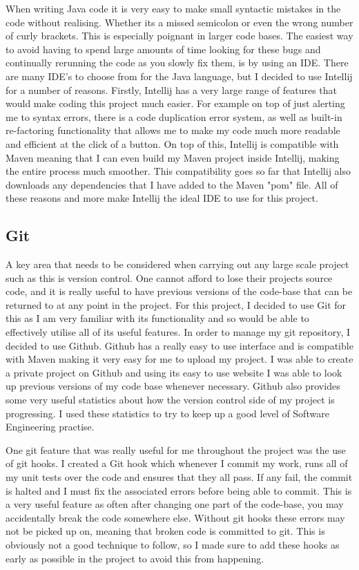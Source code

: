 When writing Java code it is very easy to make small syntactic mistakes in the code without realising. Whether its a missed semicolon or even the wrong number of curly brackets. This is especially poignant in larger code bases. The easiest way to avoid having to spend large amounts of time looking for these bugs and continually rerunning the code as you slowly fix them, is by using an IDE. There are many IDE's to choose from for the Java language, but I decided to use Intellij for a number of reasons. Firstly, Intellij has a very large range of features that would make coding this project much easier. For example on top of just alerting me to syntax errors, there is a code duplication error system, as well as built-in re-factoring functionality that allows me to make my code much more readable and efficient at the click of a button. On top of this, Intellij is compatible with Maven meaning that I can even build my Maven project inside Intellij, making the entire process much smoother. This compatibility goes so far that Intellij also downloads any dependencies that I have added to the Maven "pom" file. All of these reasons and more make Intellij the ideal IDE to use for this project.

\subsection{Git \label{git}}

A key area that needs to be considered when carrying out any large scale project such as this is version control. One cannot afford to lose their projects source code, and it is really useful to have previous versions of the code-base that can be returned to at any point in the project. For this project, I decided to use Git for this as I am very familiar with its functionality and so would be able to effectively utilise all of its useful features. In order to manage my git repository, I decided to use Github. Github has a really easy to use interface and is compatible with Maven making it very easy for me to upload my project. I was able to create a private project on Github and using its easy to use website I was able to look up previous versions of my code base whenever necessary. Github also provides some very useful statistics about how the version control side of my project is progressing. I used these statistics to try to keep up a good level of Software Engineering practise.

One git feature that was really useful for me throughout the project was the use of git hooks. I created a Git hook which whenever I commit my work, runs all of my unit tests over the code and ensures that they all pass. If any fail, the commit is halted and I must fix the associated errors before being able to commit. This is a very useful feature as often after changing one part of the code-base, you may accidentally break the code somewhere else. Without git hooks these errors may not be picked up on, meaning that broken code is committed to git.  This is obviously not a good technique to follow, so I made sure to add these hooks as early as possible in the project to avoid this from happening.

